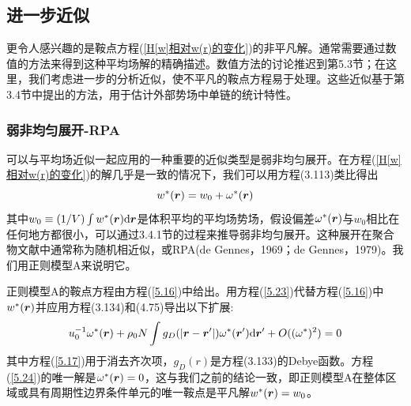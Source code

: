 \subsection{进一步近似}
更令人感兴趣的是鞍点方程(\ref{H[w]相对w(r)的变化})的非平凡解。通常需要通过数值的方法来得到这种平均场解的精确描述。数值方法的讨论推迟到第5.3节；在这里，我们考虑进一步的分析近似，使不平凡的鞍点方程易于处理。这些近似基于第3.4节中提出的方法，用于估计外部势场中单链的统计特性。
\subsubsection{弱非均匀展开-RPA}
可以与平均场近似一起应用的一种重要的近似类型是弱非均匀展开。在方程(\ref{H[w]相对w(r)的变化})的解几乎是一致的情况下，我们可以用方程(3.113)类比得出
\begin{equation}\label{5.23}
w^*(\bm{r})=w_0+\omega^*(\bm{r})
\end{equation}
其中$w_0\equiv(1/V)\int w^*(\bm{r})\mathrm{d}\bm{r}$是体积平均的平均场势场，假设偏差$\omega^*(\bm{r})$与$w_0$相比在任何地方都很小，可以通过3.4.1节的过程来推导弱非均匀展开。这种展开在聚合物文献中通常称为随机相近似，或RPA(de Gennes，1969；de Gennes，1979)。我们用正则模型A来说明它。

正则模型A的鞍点方程由方程(\ref{5.16})中给出。用方程(\ref{5.23})代替方程(\ref{5.16})中$w^*(\bm{r})$并应用方程(3.134)和(4.75)导出以下扩展:
\begin{equation}\label{5.24}
u_0^{-1}\omega^*(\bm{r})+\rho_0N\int g_D(\left|\bm{r}-\bm{r}'\right|)\omega^*(\bm{r}')\mathrm{d}\bm{r}'+O((\omega^*)^2)=0
\end{equation}
其中方程(\ref{5.17})用于消去齐次项，$g_D(r)$是方程(3.133)的Debye函数。方程(\ref{5.24})的唯一解是$\omega^*(\bm{r})=0$，这与我们之前的结论一致，即正则模型A在整体区域或具有周期性边界条件单元的唯一鞍点是平凡解$w^*(\bm{r})=w_0$。

